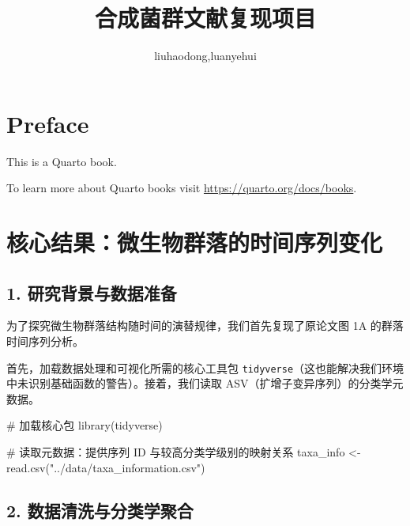 \documentclass[
  letterpaper,
  DIV=11,
  numbers=noendperiod]{scrreprt}
\title{合成菌群文献复现项目}
\author{liuhaodong,luanyehui}
\date{}
\newenvironment{Shaded}{\begin{snugshade}}{\end{snugshade}}
\newcommand{\CommentTok}[1]{\textcolor[rgb]{0.37,0.37,0.37}{#1}}
\newcommand{\FunctionTok}[1]{\textcolor[rgb]{0.28,0.35,0.67}{#1}}
\newcommand{\NormalTok}[1]{\textcolor[rgb]{0.00,0.23,0.31}{#1}}
\newcommand{\OtherTok}[1]{\textcolor[rgb]{0.00,0.23,0.31}{#1}}
\newcommand{\StringTok}[1]{\textcolor[rgb]{0.13,0.47,0.30}{#1}}
\renewcommand*\contentsname{Table of contents}
\newcommand\contentsname{Table of contents}
\begin{document}
\maketitle

\renewcommand*\contentsname{Table of contents}
{
\hypersetup{linkcolor=}
\setcounter{tocdepth}{2}
\tableofcontents
}


\chapter*{Preface}\label{preface}


This is a Quarto book.

To learn more about Quarto books visit
\url{https://quarto.org/docs/books}.


\chapter{核心结果：微生物群落的时间序列变化}\label{ux6838ux5fc3ux7ed3ux679cux5faeux751fux7269ux7fa4ux843dux7684ux65f6ux95f4ux5e8fux5217ux53d8ux5316}

\section{1.
研究背景与数据准备}\label{ux7814ux7a76ux80ccux666fux4e0eux6570ux636eux51c6ux5907}

为了探究微生物群落结构随时间的演替规律，我们首先复现了原论文图 1A
的群落时间序列分析。

首先，加载数据处理和可视化所需的核心工具包
\texttt{tidyverse}（这也能解决我们环境中未识别基础函数的警告）。接着，我们读取
ASV（扩增子变异序列）的分类学元数据。

\begin{Shaded}
\begin{Highlighting}[]
\CommentTok{\# 加载核心包}
\FunctionTok{library}\NormalTok{(tidyverse)}

\CommentTok{\# 读取元数据：提供序列 ID 与较高分类学级别的映射关系}
\NormalTok{taxa\_info }\OtherTok{\textless{}{-}} \FunctionTok{read.csv}\NormalTok{(}\StringTok{"../data/taxa\_information.csv"}\NormalTok{)}
\end{Highlighting}
\end{Shaded}

\section{2.
数据清洗与分类学聚合}\label{ux6570ux636eux6e05ux6d17ux4e0eux5206ux7c7bux5b66ux805aux5408}
\end{document}
